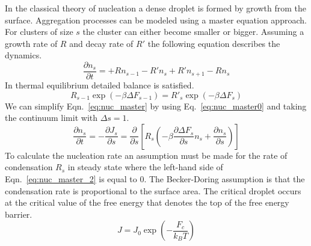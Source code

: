 In the classical theory of nucleation a dense droplet is formed by growth from the surface. Aggregation processes can be modeled using a master equation approach. For clusters of size $s$ the cluster can either become smaller or bigger. Assuming a growth rate of $R$ and decay rate of $R'$ the following equation describes the dynamics. %
\begin{equation}
\frac{\partial n_s}{\partial t}  = + R n_{s-1} - R' n_{s} + R' n_{s+1} - R n_s
	\label{eq:nuc_master}
\end{equation}%
In thermal equilibrium detailed balance is satisfied.
\begin{equation}
	\label{eq:nuc_master0}
R_{s-1} \exp{(-\beta \Delta F_{s-1})} = R'_{s} \exp{(-\beta \Delta F_{s})} 
\end{equation}%
We can simplify Eqn.~\eqref{eq:nuc_master} by using Eq.~\eqref{eq:nuc_master0} and taking the continuum limit with $\Delta s = 1$.%
\begin{equation}
\frac{\partial n_s}{\partial t}  = - \frac{\partial J_s}{\partial s} = \frac{\partial}{\partial s} [
R_s(
-\beta  \frac{\partial \Delta F_s }{\partial s} n_s + \frac{\partial n_s}{\partial s} 
)
]
\label{eq:nuc_master_2}
\end{equation}%
To calculate the nucleation rate an assumption must be made for the rate of condensation $R_s$ in steady state where the left-hand side of Eqn.~\eqref{eq:nuc_master_2} is equal to $0$. The Becker-Doring assumption is that the condensation rate is proportional to the surface area. The critical droplet  occurs at the critical value of the free energy that denotes the top of the free energy barrier. %
\begin{equation}
J = J_0 \exp{(-\frac{F_c}{k_B T})}
\label{eq:nuc_becker}
\end{equation}%
